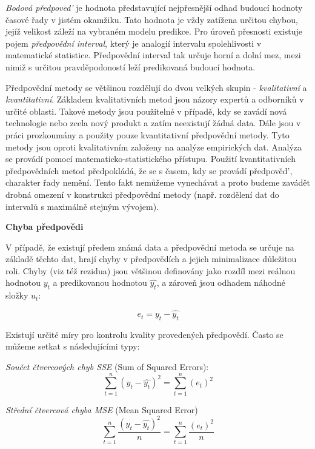 \documentclass[a4paper,12pt,twoside]{scrreprt}
\begin{document}
\textit{Bodová předpoved'} je hodnota představující nejpřesnější odhad budoucí hodnoty časové řady v jistém okamžiku. Tato hodnota je vždy zatížena určitou chybou, jejíž velikost záleží na vybraném modelu predikce. Pro úroveň přesnosti existuje pojem \textit{předpovědní interval}, který je analogií intervalu spolehlivosti v matematické statistice. Předpovědní interval tak určuje horní a dolní mez, mezi nimiž s určitou pravděpodoností leží predikovaná budoucí hodnota.  

Předpovědní metody se většinou rozdělují do dvou velkých skupin - \textit{kvalitativní} a \textit{kvantitativní}. Základem kvalitativních metod jsou názory expertů a odborníků v určité oblasti. Takové metody jsou použitelné v případě, kdy se zavádí nová technologie nebo zcela nový produkt a zatím neexistují žádná data. Dále jsou v práci prozkoumány a použity pouze kvantitativní předpovědní metody. Tyto metody jsou oproti kvalitativním založeny na analýze empirických dat. Analýza se provádí pomocí matematicko-statistického přístupu. Použití kvantitativních předpovědních metod předpokládá, že se s časem, kdy se provádí předpověd', charakter řady nemění. Tento fakt nemůžeme vynechávat a proto budeme zavádět drobná omezení v konstrukci předpovědní metody (např. rozdělení dat do intervalů s maximálně stejným vývojem). \cite{cipra}

\normalsize \textbf{Chyba předpovědi}

V případě, že existují předem známá data a předpovědní metoda se určuje na základě těchto dat, hrají chyby v předpovědích a jejich minimalizace důležitou roli. Chyby (viz též rezidua) jsou většinou definovány jako rozdíl mezi reálnou hodnotou $y_t$ a predikovanou hodnotou $\hat{y_t}$, a zároveň jsou odhadem náhodné složky $u_t$:

\begin{equation}
e_t = y_t - \hat{y_t}
\end{equation}

Existují určité míry pro kontrolu kvality provedených předpovědí. Často se můžeme setkat s následujícími typy: 

\textit{Součet čtvercových chyb SSE} (Sum of Squared Errors):
\begin{equation}
\sum_{t=1}^{n}(y_t - \hat{y_t})^2 = \sum_{t=1}^{n}(e_t)^2
\end{equation}

\textit{Střední čtvercová chyba MSE} (Mean Squared Error)
\begin{equation}
\sum_{t=1}^{n}\frac{(y_t - \hat{y_t})^2}{n} = \sum_{t=1}^{n}\frac{(e_t)^2}{n}
\end{equation}
\end{document}
